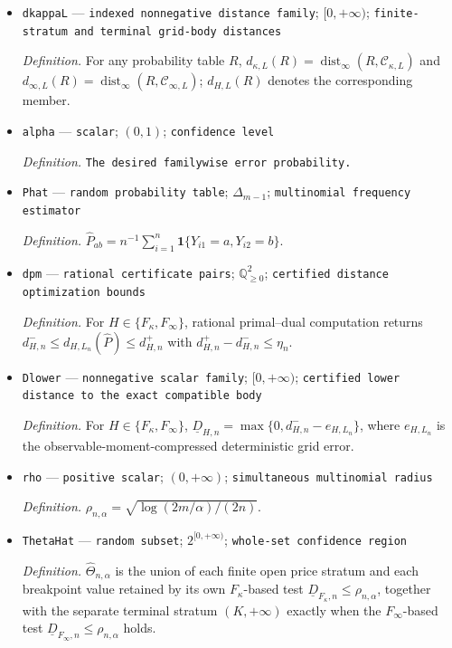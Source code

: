 \documentclass{article}
\begin{document}
\begin{itemize}
  \par\smallskip\noindent\emph{Definition.} For \(H\in\{F_\kappa,F_\infty\}\), \(e_{H,L}=0\) if \(|H|=1\), and \(e_{H,L}=\min\{1,2(\min\{|H|,m\}-1)/L\}\) otherwise.
  \item \texttt{dkappaL} --- \texttt{indexed nonnegative distance family}; \([0,+\infty)\); \texttt{finite-\allowbreak{}stratum and terminal grid-\allowbreak{}body distances}
  \par\smallskip\noindent\emph{Definition.} For any probability table \(R\), \(d_{\kappa,L}(R)=\operatorname{dist}_\infty(R,\mathcal C_{\kappa,L})\) and \(d_{\infty,L}(R)=\operatorname{dist}_\infty(R,\mathcal C_{\infty,L})\); \(d_{H,L}(R)\) denotes the corresponding member.
  \item \texttt{alpha} --- \texttt{scalar}; \((0,1)\); \texttt{confidence level}
  \par\smallskip\noindent\emph{Definition.} \texttt{The desired familywise error probability.}
  \item \texttt{Phat} --- \texttt{random probability table}; \(\Delta_{m-1}\); \texttt{multinomial frequency estimator}
  \par\smallskip\noindent\emph{Definition.} \(\widehat P_{ab}=n^{-1}\sum_{i=1}^n\mathbf 1\{Y_{i1}=a,Y_{i2}=b\}\).
  \item \texttt{dpm} --- \texttt{rational certificate pairs}; \(\mathbb Q_{\ge0}^2\); \texttt{certified distance optimization bounds}
  \par\smallskip\noindent\emph{Definition.} For \(H\in\{F_\kappa,F_\infty\}\), rational primal--dual computation returns \(d^-_{H,n}\le d_{H,L_n}(\widehat P)\le d^+_{H,n}\) with \(d^+_{H,n}-d^-_{H,n}\le\eta_n\).
  \item \texttt{Dlower} --- \texttt{nonnegative scalar family}; \([0,+\infty)\); \texttt{certified lower distance to the exact compatible body}
  \par\smallskip\noindent\emph{Definition.} For \(H\in\{F_\kappa,F_\infty\}\), \(\underline D_{H,n}=\max\{0,d^-_{H,n}-e_{H,L_n}\}\), where \(e_{H,L_n}\) is the observable-moment-compressed deterministic grid error.
  \item \texttt{rho} --- \texttt{positive scalar}; \((0,+\infty)\); \texttt{simultaneous multinomial radius}
  \par\smallskip\noindent\emph{Definition.} \(\rho_{n,\alpha}=\sqrt{\log(2m/\alpha)/(2n)}\).
  \item \texttt{ThetaHat} --- \texttt{random subset}; \(2^{[0,+\infty)}\); \texttt{whole-\allowbreak{}set confidence region}
  \par\smallskip\noindent\emph{Definition.} \(\widehat\Theta_{n,\alpha}\) is the union of each finite open price stratum and each breakpoint value retained by its own \(F_\kappa\)-based test \(\underline D_{F_\kappa,n}\le\rho_{n,\alpha}\), together with the separate terminal stratum \((K,+\infty)\) exactly when the \(F_\infty\)-based test \(\underline D_{F_\infty,n}\le\rho_{n,\alpha}\) holds.
\end{itemize}
\end{document}
